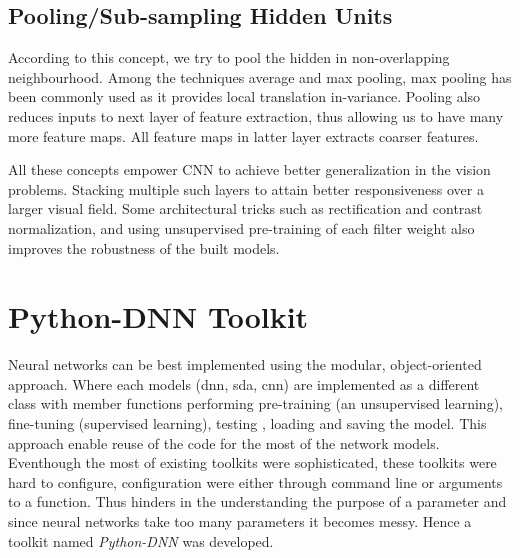 \subsection{Pooling/Sub-sampling Hidden Units}
According to this concept, we try to pool the hidden in non-overlapping neighbourhood. Among the techniques average and max pooling, max pooling has been commonly used as it provides local translation in-variance. Pooling also reduces inputs to next layer of feature extraction, thus allowing us to have many more feature maps. All feature maps in latter layer extracts coarser features.\par
All these concepts empower CNN to achieve better generalization in the vision problems. Stacking multiple such layers to attain better responsiveness over a larger visual field. Some architectural tricks such as rectification and contrast normalization, and using unsupervised pre-training of each filter weight also improves the robustness of the built models.
\section{Python-DNN Toolkit}
 \label{sec:pyDNN}
Neural networks can be best implemented using the modular, object-oriented approach. Where each models (dnn, sda, cnn) are implemented as a different class with member functions performing pre-training (an unsupervised learning), fine-tuning (supervised learning), testing , loading and saving the model. This approach enable reuse of the code for the most of the network models. Eventhough the most of existing toolkits were sophisticated, these toolkits were hard to configure, configuration were either through command line or arguments to a function. Thus hinders in the understanding the purpose of a parameter and since neural networks take too many parameters it becomes messy.
Hence a toolkit named \textit{Python-DNN} was developed.  
